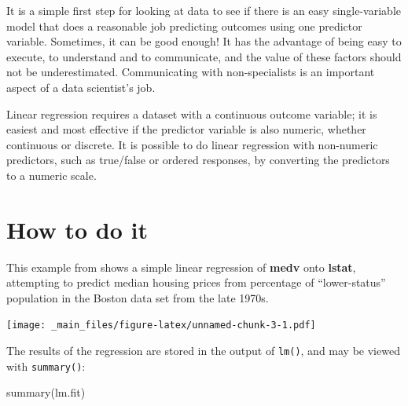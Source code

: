 \documentclass[
]{book}
\newenvironment{Shaded}{\begin{snugshade}}{\end{snugshade}}
\newcommand{\AttributeTok}[1]{\textcolor[rgb]{0.77,0.63,0.00}{#1}}
\newcommand{\DecValTok}[1]{\textcolor[rgb]{0.00,0.00,0.81}{#1}}
\newcommand{\FunctionTok}[1]{\textcolor[rgb]{0.00,0.00,0.00}{#1}}
\newcommand{\NormalTok}[1]{#1}
\newcommand{\OtherTok}[1]{\textcolor[rgb]{0.56,0.35,0.01}{#1}}
\newcommand{\SpecialCharTok}[1]{\textcolor[rgb]{0.00,0.00,0.00}{#1}}
\newcommand{\StringTok}[1]{\textcolor[rgb]{0.31,0.60,0.02}{#1}}
\begin{document}
It is a simple first step for looking at data to see if there is an easy single-variable model that does a reasonable job predicting outcomes using one predictor variable. Sometimes, it can be good enough! It has the advantage of being easy to execute, to understand and to communicate, and the value of these factors should not be underestimated. Communicating with non-specialists is an important aspect of a data scientist's job.

Linear regression requires a dataset with a continuous outcome variable; it is easiest and most effective if the predictor variable is also numeric, whether continuous or discrete. It is possible to do linear regression with non-numeric predictors, such as true/false or ordered responses, by converting the predictors to a numeric scale.

\hypertarget{how-to-do-it}{%
\section{How to do it}\label{how-to-do-it}}

This example from \citet{ISLR} shows a simple linear regression of \textbf{medv} onto \textbf{lstat}, attempting to predict median housing prices from percentage of ``lower-status'' population in the Boston data set from the late 1970s.

\begin{Shaded}
\end{Shaded}

\texttt{[image: \_main\_files/figure-latex/unnamed-chunk-3-1.pdf]}

The results of the regression are stored in the output of \texttt{lm()}, and may be viewed with \texttt{summary()}:

\begin{Shaded}
\begin{Highlighting}[]
\FunctionTok{summary}\NormalTok{(lm.fit)}
\end{Highlighting}
\end{Shaded}
\end{document}
